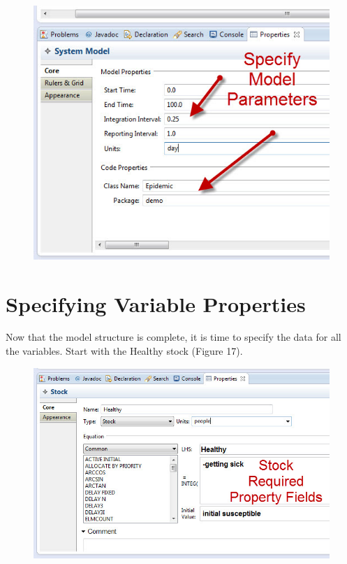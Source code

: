 \documentclass[11pt]{amsart}
\begin{document}
\begin{figure}[ht]
\begin{center}
\vspace{.2in}
\centerline {
\includegraphics[totalheight=0.4\textheight]{images/016.jpg}
}
\caption{}
\label{fig:016}
\end{center}
\end{figure}

\clearpage


\section{Specifying Variable Properties}
Now that the model structure is complete, it is time to specify the data for all the variables. Start with the Healthy stock (Figure 17).



\begin{figure}[ht]
\begin{center}
\vspace{.2in}
\centerline {
\includegraphics[totalheight=0.3\textheight]{images/017.jpg}
}
\caption{}
\label{fig:017}
\end{center}
\end{figure}
\end{document}
